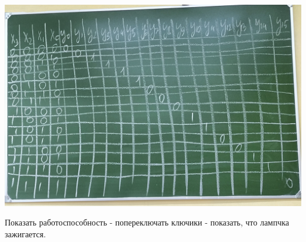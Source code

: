 \documentclass{article}
\begin{document}
\begin{flushleft}
\includegraphics[width=\textwidth]{assets/image_2.jpg}

Показать работоспособность - попереключать ключики - показать, что лампчка зажигается.

\end{flushleft}
\end{document}
